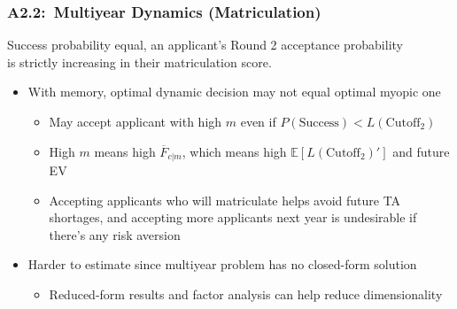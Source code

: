 \documentclass[12pt, aspectratio=169]{beamer}
\begin{document}
\begin{frame}[label=mdm]
\frametitle{A2.2:\ Multiyear Dynamics (Matriculation)}
\begin{theorem}
Success probability equal, an applicant's Round 2 acceptance probability \\ is strictly increasing in their matriculation score.
\end{theorem}
\vspace{2.5pt}
\begin{itemize}
\item With memory, optimal dynamic decision may not equal optimal myopic one
\vspace{5pt}
\begin{itemize}
\item May accept applicant with high $m$ even if $P(\text{Success})<L(\text{Cutoff}_2)$
\vspace{5pt}
\item High $m$ means high $\overline{F}_{c|m}$, which means high $\mathbb{E}[L(\text{Cutoff}_2)']$ and future EV
\vspace{5pt}
\item Accepting applicants who will matriculate helps avoid future TA shortages, and accepting more applicants next year is undesirable if there's any risk aversion
\vspace{10pt}
\end{itemize}
\item Harder to estimate since multiyear problem has no closed-form solution
\vspace{5pt}
\begin{itemize}
\item Reduced-form results and factor analysis can help reduce dimensionality
\vspace{5pt}
\end{itemize}
\end{itemize}
\hyperlink{conc}{}
\end{frame}
\end{document}
